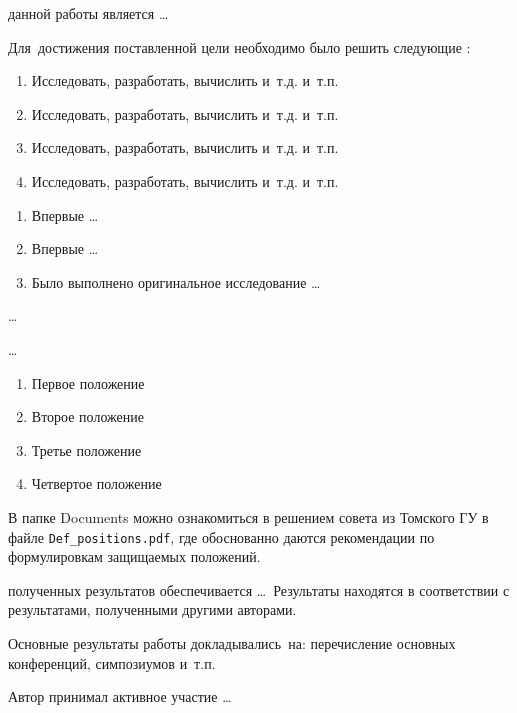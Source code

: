 {\aim} данной работы является \ldots

Для~достижения поставленной цели необходимо было решить следующие {\tasks}:
\begin{enumerate}
  \item Исследовать, разработать, вычислить и~т.\:д. и~т.\:п.
  \item Исследовать, разработать, вычислить и~т.\:д. и~т.\:п.
  \item Исследовать, разработать, вычислить и~т.\:д. и~т.\:п.
  \item Исследовать, разработать, вычислить и~т.\:д. и~т.\:п.
\end{enumerate}


{\novelty}
\begin{enumerate}
  \item Впервые \ldots
  \item Впервые \ldots
  \item Было выполнено оригинальное исследование \ldots
\end{enumerate}

{\influence} \ldots

{\methods} \ldots

{}
\begin{enumerate}
  \item Первое положение
  \item Второе положение
  \item Третье положение
  \item Четвертое положение
\end{enumerate}
В папке Documents можно ознакомиться в решением совета из Томского ГУ
в файле \verb+Def_positions.pdf+, где обоснованно даются рекомендации
по формулировкам защищаемых положений. 

{\reliability} полученных результатов обеспечивается \ldots \ Результаты находятся в соответствии с результатами, полученными другими авторами.


{\probation}
Основные результаты работы докладывались~на:
перечисление основных конференций, симпозиумов и~т.\:п.

{\contribution} Автор принимал активное участие \ldots


